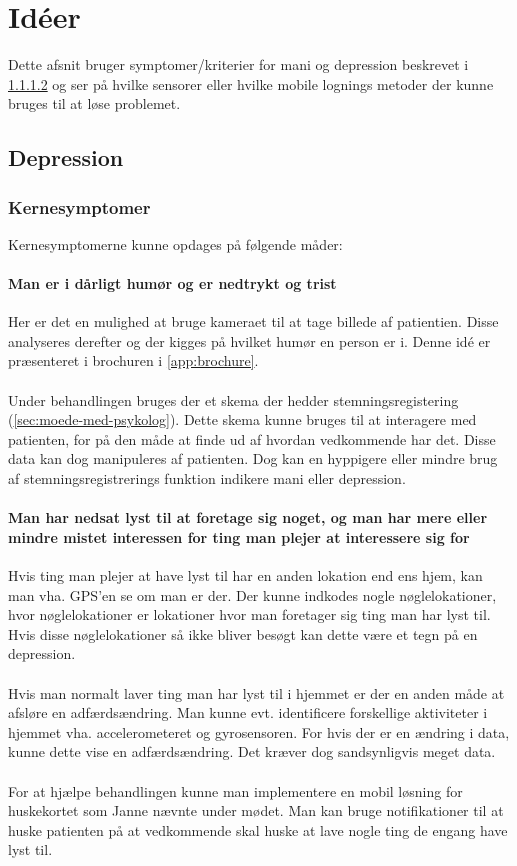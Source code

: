 \section{Idéer}
Dette afsnit bruger symptomer/kriterier for mani og depression beskrevet i \cref{} og ser på hvilke sensorer eller hvilke mobile lognings metoder der kunne bruges til at løse problemet.

\subsection{Depression}

\subsubsection{Kernesymptomer}
Kernesymptomerne kunne opdages på følgende måder:

\paragraph{Man er i dårligt humør og er nedtrykt og trist}\label{darligthumor}
Her er det en mulighed at bruge kameraet til at tage billede af patientien. Disse analyseres derefter og der kigges på hvilket humør en person er i. Denne idé er præsenteret i brochuren i \cref{app:brochure}.
\\
\\
Under behandlingen bruges der et skema der hedder stemningsregistering (\cref{sec:moede-med-psykolog}). Dette skema kunne bruges til at interagere med patienten, for på den måde at finde ud af hvordan vedkommende har det. Disse data kan dog manipuleres af patienten. Dog kan en hyppigere eller mindre brug af stemningsregistrerings funktion indikere mani eller depression.
\paragraph{Man har nedsat lyst til at foretage sig noget, og man har mere eller mindre mistet interessen for ting man plejer at interessere sig for}
Hvis ting man plejer at have lyst til har en anden lokation end ens hjem, kan man vha. GPS'en se om man er der. Der kunne indkodes nogle nøglelokationer, hvor nøglelokationer er lokationer hvor man foretager sig ting man har lyst til.
Hvis disse nøglelokationer så ikke bliver besøgt kan dette være et tegn på en depression.
\\
\\
Hvis man normalt laver ting man har lyst til i hjemmet er der en anden måde at afsløre en adfærdsændring. Man kunne evt. identificere forskellige aktiviteter i hjemmet vha. accelerometeret og gyrosensoren. For hvis der er en ændring i data, kunne dette vise en adfærdsændring. Det kræver dog sandsynligvis meget data.
\\
\\
For at hjælpe behandlingen kunne man implementere en mobil løsning for huskekortet som Janne nævnte under mødet. Man kan bruge notifikationer til at huske patienten på at vedkommende skal huske at lave nogle ting de engang have lyst til.


